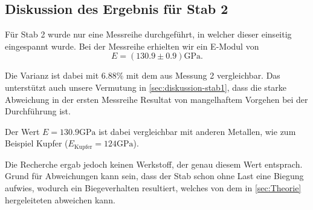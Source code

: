 \subsection{Diskussion des Ergebnis für Stab 2}
\label{sec:diskussion-stab2}

Für Stab 2 wurde nur eine Messreihe durchgeführt, in welcher dieser einseitig eingespannt wurde.
Bei der Messreihe erhielten wir ein E-Modul von
\begin{equation}
	E = (130.9 \pm 0.9) \si{\giga\pascal}.
	\label{eqn:emodul2}
\end{equation}

Die Varianz ist dabei mit $6.88\%$ mit dem aus Messung 2 vergleichbar. Das unterstützt 
auch unsere Vermutung in \autoref{sec:diskussion-stab1}, dass die starke Abweichung
in der ersten Messreihe Resultat von mangelhaftem Vorgehen bei der Durchführung ist.

Der Wert $E = 130.9 \si{\giga\pascal}$ ist dabei vergleichbar mit anderen Metallen, wie zum
Beispiel Kupfer ($E_\text{Kupfer} = 124 \si{\giga\pascal}$\cite{MaWi}).

Die Recherche ergab jedoch keinen Werkstoff, der genau diesem Wert entsprach. Grund für 
Abweichungen kann sein, dass der Stab schon ohne Last eine Biegung aufwies, wodurch ein 
Biegeverhalten resultiert, welches von dem in \autoref{sec:Theorie} hergeleiteten
abweichen kann.
